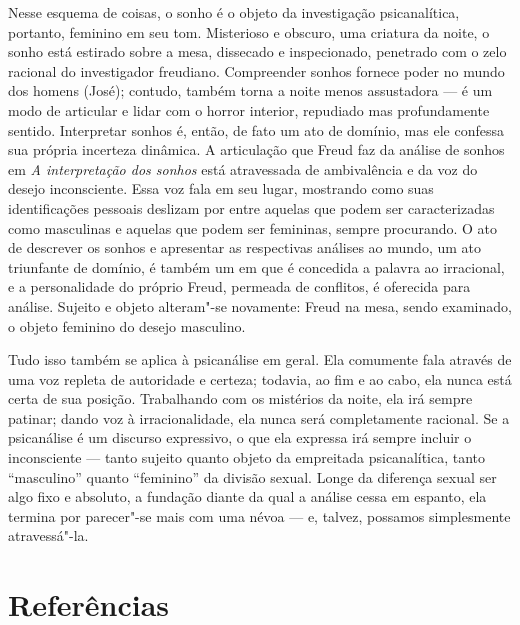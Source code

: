 Nesse esquema de coisas, o sonho é o objeto da investigação
psicanalítica, portanto, feminino em seu tom. Misterioso e obscuro, uma
criatura da noite, o sonho está estirado sobre a mesa, dissecado e
inspecionado, penetrado com o zelo racional do investigador freudiano.
Compreender sonhos fornece poder no mundo dos homens (José); contudo,
também torna a noite menos assustadora --- é um modo de articular e lidar
com o horror interior, repudiado mas profundamente sentido. Interpretar
sonhos é, então, de fato um ato de domínio, mas ele confessa sua própria
incerteza dinâmica. A articulação que Freud faz da análise de sonhos em
\emph{A interpretação dos sonhos} está atravessada de ambivalência e da
voz do desejo inconsciente. Essa voz fala em seu lugar, mostrando como
suas identificações pessoais deslizam por entre aquelas que podem ser
caracterizadas como masculinas e aquelas que podem ser femininas, sempre
procurando. O ato de descrever os sonhos e apresentar as respectivas
análises ao mundo, um ato triunfante de domínio, é também um em que é
concedida a palavra ao irracional, e a personalidade do próprio Freud,
permeada de conflitos, é oferecida para análise. Sujeito e objeto
alteram"-se novamente: Freud na mesa, sendo examinado, o objeto feminino
do desejo masculino.

Tudo isso também se aplica à psicanálise em geral. Ela comumente fala
através de uma voz repleta de autoridade e certeza; todavia, ao fim e ao
cabo, ela nunca está certa de sua posição. Trabalhando com os mistérios
da noite, ela irá sempre patinar; dando voz à irracionalidade, ela nunca
será completamente racional. Se a psicanálise é um discurso expressivo,
o que ela expressa irá sempre incluir o inconsciente --- tanto sujeito
quanto objeto da empreitada psicanalítica, tanto ``masculino'' quanto
``feminino'' da divisão sexual. Longe da diferença sexual ser algo fixo
e absoluto, a fundação diante da qual a análise cessa em espanto, ela
termina por parecer"-se mais com uma névoa --- e, talvez, possamos
simplesmente atravessá"-la.

\section{Referências}

